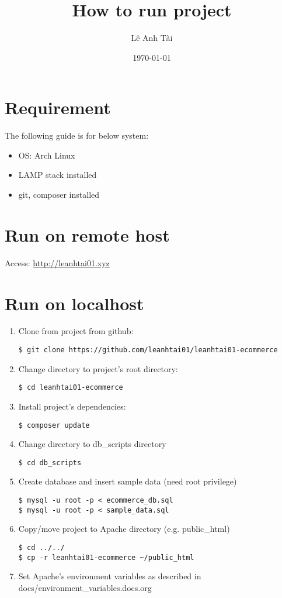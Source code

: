 \documentclass[11pt]{article}
\author{Lê Anh Tài}
\date{\today}
\title{How to run project}
\begin{document}
\maketitle
\tableofcontents

\section{Requirement}
\label{sec:orgfebe192}
The following guide is for below system:
\begin{itemize}
\item OS: Arch Linux
\item LAMP stack installed
\item git, composer installed
\end{itemize}
\section{Run on remote host}
\label{sec:org1f0f34a}
Access: \url{http://leanhtai01.xyz}  
\section{Run on localhost}
\label{sec:org1b7fd8e}
\begin{enumerate}
\item Clone from project from github:
\begin{verbatim}
$ git clone https://github.com/leanhtai01/leanhtai01-ecommerce
\end{verbatim}
\item Change directory to project's root directory:
\begin{verbatim}
$ cd leanhtai01-ecommerce
\end{verbatim}
\item Install project's dependencies:
\begin{verbatim}
$ composer update
\end{verbatim}
\item Change directory to db\_scripts directory
\begin{verbatim}
$ cd db_scripts
\end{verbatim}
\item Create database and insert sample data (need root privilege)
\begin{verbatim}
$ mysql -u root -p < ecommerce_db.sql
$ mysql -u root -p < sample_data.sql
\end{verbatim}
\item Copy/move project to Apache directory (e.g. public\_html)
\begin{verbatim}
$ cd ../../
$ cp -r leanhtai01-ecommerce ~/public_html
\end{verbatim}
\item Set Apache's environment variables as described in
docs/environment\_variables.docs.org
\end{enumerate}
\end{document}
